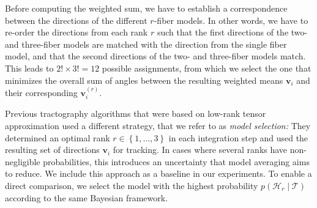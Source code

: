Before computing the weighted sum, we have to establish a correspondence between the directions of the
different $r$-fiber models. In other words, we have to re-order the directions from each rank $r$ such that the first directions of the two- and three-fiber models are matched with the direction from the single fiber model, and that the second directions of the two- and three-fiber models match. This leads to $2! \times 3! =12$ possible assignments, from which we
select the one that minimizes the overall sum of angles between the resulting
weighted means $\mathbf{v}_i$ and their corresponding $\mathbf{v}_i^{\left( r
\right)}$.

Previous tractography algorithms that were based on low-rank tensor approximation \cite{Ankele:CARS2017} used a different strategy, that we refer to as \emph{model selection:} They determined an optimal rank $r \in \left\{ 1,\dots , 3 \right\}$ in each integration step and used the resulting set of
directions $\mathbf{v}_i$ for tracking. In cases where several ranks have non-negligible probabilities, this introduces an uncertainty that model averaging aims to reduce. We include this approach
as a baseline in our experiments. To enable a direct comparison, we select the model with the highest probability $p \left(
 \mathcal{H}_r \mid \mathcal{T} \right)$ according to the same Bayesian framework.
 

